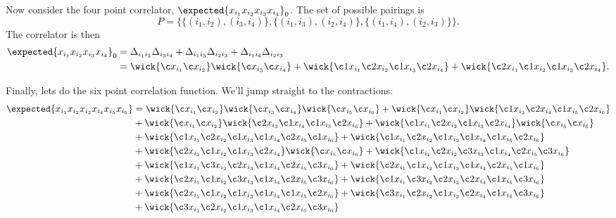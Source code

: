 \documentclass[fleqn]{NotesClass}
\begin{document}
    Now consider the four point correlator, \(\expected{x_{i_1}x_{i_2}x_{i_3}x_{i_4}}_0\).
    The set of possible pairings is
    \begin{equation}
        P = \{\{(i_1, i_2), (i_3, i_4)\}, \{(i_1, i_3), (i_2, i_4)\}, \{(i_1, i_4), (i_2, i_3)\}\}.
    \end{equation}
    The correlator is then
    \begin{align}\label{eqn:4 point correlator}
        \expected{x_{i_1}x_{i_2}x_{i_3}x_{i_4}}_0 &= \Delta_{i_1i_2}\Delta_{i_3i_4} + \Delta_{i_1i_3}\Delta_{i_2i_3} + \Delta_{i_1i_4}\Delta_{i_2i_3}\\
        &= \wick{\c x_{i_1} \c x_{i_2}} \wick{\c x_{i_3} \c x_{i_4}} + \wick{\c1 x_{i_1} \c2 x_{i_2} \c1 x_{i_3} \c2 x_{i_4}} + \wick{\c2 x_{i_1} \c1 x_{i_2} \c1 x_{i_3} \c2 x_{i_4}}.
    \end{align}
    
    Finally, lets do the six point correlation function.
    We'll jump straight to the contractions:
    \begin{align}
        \expected{x_{i_1}x_{i_2}x_{i_3}x_{i_4}x_{i_5}x_{i_6}} &=
        \wick{\c x_{i_1} \c x_{i_2}} \wick{\c x_{i_3} \c x_{i_4}} \wick{\c x_{i_5} \c x_{i_6}}
        + \wick{\c x_{i_1} \c x_{i_2}} \wick{\c1 x_{i_3} \c2 x_{i_4} \c1 x_{i_5} \c2 x_{i_6}}\\
        &+ \wick{\c x_{i_1} \c x_{i_2}} \wick{\c2 x_{i_3} \c1 x_{i_4} \c1 x_{i_5} \c2 x_{i_6}}
        + \wick{\c1 x_{i_1} \c2 x_{i_2} \c1 x_{i_3} \c2 x_{i_4}} \wick{\c x_{i_5} \c x_{i_6}}\\
        &+ \wick{\c1 x_{i_1} \c2 x_{i_2} \c1 x_{i_3} \c1 x_{i_4} \c2 x_{i_5} \c1 x_{i_6}}
        + \wick{\c1 x_{i_1} \c2 x_{i_2} \c1 x_{i_3} \c1 x_{i_4} \c1 x_{i_5} \c2 x_{i_6}}\\
        &+ \wick{\c2 x_{i_1} \c1 x_{i_2} \c1 x_{i_3} \c2 x_{i_4}} \wick{\c x_{i_5} \c x_{i_6}}
        + \wick{\c1 x_{i_1} \c2 x_{i_2} \c3 x_{i_3} \c1 x_{i_4} \c2 x_{i_5} \c3 x_{i_6}}\\
        &+ \wick{\c1 x_{i_1} \c3 x_{i_2} \c2 x_{i_3} \c1 x_{i_4} \c2 x_{i_5} \c3 x_{i_6}}
        + \wick{\c2 x_{i_1} \c1 x_{i_2} \c1 x_{i_3} \c1 x_{i_4} \c2 x_{i_5} \c1 x_{i_6}}\\
        &+ \wick{\c2 x_{i_1} \c1 x_{i_2} \c3 x_{i_3} \c1 x_{i_4} \c2 x_{i_5} \c3 x_{i_6}}
        + \wick{\c1 x_{i_1} \c3 x_{i_2} \c2 x_{i_3} \c2 x_{i_4} \c1 x_{i_5} \c3 x_{i_6}}\\
        &+ \wick{\c2 x_{i_1} \c1 x_{i_2} \c1 x_{i_3} \c1 x_{i_4} \c1 x_{i_5} \c2 x_{i_6}}
        + \wick{\c3 x_{i_1} \c2 x_{i_2} \c1 x_{i_3} \c2 x_{i_4} \c1 x_{i_5} \c3 x_{i_6}}\\
        &+ \wick{\c3 x_{i_1} \c2 x_{i_2} \c1 x_{i_3} \c1 x_{i_4} \c2 x_{i_5} \c3 x_{i_6}}
    \end{align}
    
\end{document}
